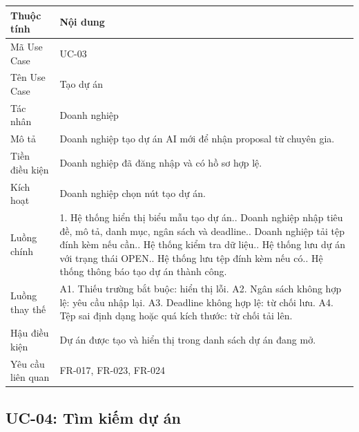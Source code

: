 \begin{longtable}{|p{3.5cm}|p{10.2cm}|}
\hline
\textbf{Thuộc tính} & \textbf{Nội dung} \\ \hline
Mã Use Case & UC-03 \\ \hline
Tên Use Case & Tạo dự án \\ \hline
Tác nhân & Doanh nghiệp \\ \hline
Mô tả & Doanh nghiệp tạo dự án AI mới để nhận proposal từ chuyên gia. \\ \hline
Tiền điều kiện & Doanh nghiệp đã đăng nhập và có hồ sơ hợp lệ. \\ \hline
Kích hoạt & Doanh nghiệp chọn nút tạo dự án. \\ \hline
Luồng chính &
1. Hệ thống hiển thị biểu mẫu tạo dự án.\newline
2. Doanh nghiệp nhập tiêu đề, mô tả, danh mục, ngân sách và deadline.\newline
3. Doanh nghiệp tải tệp đính kèm nếu cần.\newline
4. Hệ thống kiểm tra dữ liệu.\newline
5. Hệ thống lưu dự án với trạng thái OPEN.\newline
6. Hệ thống lưu tệp đính kèm nếu có.\newline
7. Hệ thống thông báo tạo dự án thành công. \\ \hline
Luồng thay thế &
A1. Thiếu trường bắt buộc: hiển thị lỗi.\newline
A2. Ngân sách không hợp lệ: yêu cầu nhập lại.\newline
A3. Deadline không hợp lệ: từ chối lưu.\newline
A4. Tệp sai định dạng hoặc quá kích thước: từ chối tải lên. \\ \hline
Hậu điều kiện & Dự án được tạo và hiển thị trong danh sách dự án đang mở. \\ \hline
Yêu cầu liên quan & FR-017, FR-023, FR-024 \\ \hline
\end{longtable}

\subsection{UC-04: Tìm kiếm dự án}

